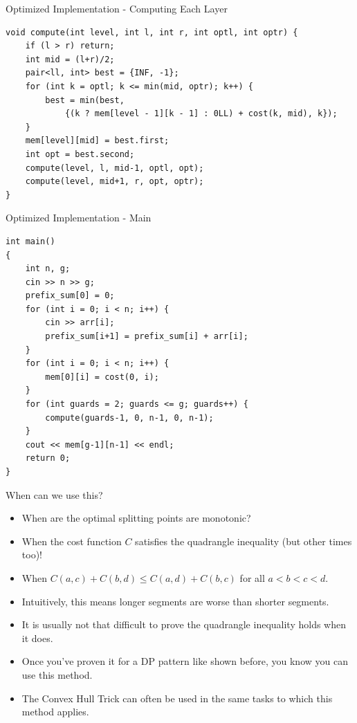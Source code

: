 \documentclass{beamer}
\begin{document}
\begin{frame}{Optimized Implementation - Computing Each Layer}
    \begin{scriptsize}
        \begin{verbatim}           
void compute(int level, int l, int r, int optl, int optr) {
    if (l > r) return;
    int mid = (l+r)/2;
    pair<ll, int> best = {INF, -1};
    for (int k = optl; k <= min(mid, optr); k++) {
        best = min(best,
            {(k ? mem[level - 1][k - 1] : 0LL) + cost(k, mid), k});
    }
    mem[level][mid] = best.first;
    int opt = best.second;
    compute(level, l, mid-1, optl, opt);
    compute(level, mid+1, r, opt, optr);
}
        \end{verbatim}
    \end{scriptsize}
\end{frame}

\begin{frame}{Optimized Implementation - Main}
    \begin{scriptsize}
        \begin{verbatim}           
int main()
{
    int n, g;
    cin >> n >> g;
    prefix_sum[0] = 0;
    for (int i = 0; i < n; i++) {
        cin >> arr[i];
        prefix_sum[i+1] = prefix_sum[i] + arr[i];
    }
    for (int i = 0; i < n; i++) {
        mem[0][i] = cost(0, i);
    }
    for (int guards = 2; guards <= g; guards++) {
        compute(guards-1, 0, n-1, 0, n-1);
    }
    cout << mem[g-1][n-1] << endl;
    return 0;
}
        \end{verbatim}
    \end{scriptsize}
\end{frame}

\begin{frame}[plain]{When can we use this?}
    \begin{itemize}
        \item<1-> When are the optimal splitting points are monotonic?
        \item<2-> When the cost function $C$ satisfies the quadrangle inequality (but other times too)!
        \item<3-> When $C(a, c) + C(b, d) \leq C(a, d) + C(b, c)$ for all $a < b < c < d$.
        \item<4-> Intuitively, this means longer segments are worse than shorter segments.
        \item<5-> It is usually not that difficult to prove the quadrangle inequality holds when it does.
        \item<6-> Once you've proven it for a DP pattern like shown before, you know you can use this method.
        \item<7-> The Convex Hull Trick can often be used in the same tasks to which this method applies.
    \end{itemize}
\end{frame}
\end{document}
